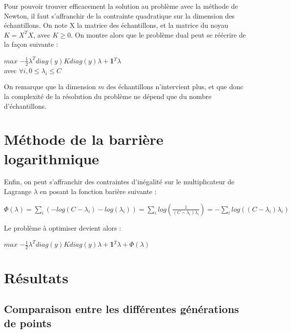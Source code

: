 \documentclass{article}
\begin{document}
Pour pouvoir trouver efficacement la solution au problème avec la méthode de Newton, il faut s'affranchir de la contrainte quadratique sur la dimension des échantillons. On note X la matrice des échantillons, et la matrice du noyau $K = X^TX$, avec $K \geq 0$. On montre alors que le problème dual peut se réécrire de la façon suivante :\\

                 \begin{center}
                 $max$ $-\frac{1}{2}\lambda^Tdiag(y)Kdiag(y)\lambda+$\textbf{1}$^T\lambda$\\
                 avec $\forall i, 0 \leq \lambda_i \leq C$ 
                 \end{center}

On remarque que la dimension $m$ des échantillons n'intervient plus, et que donc la complexité de la résolution du problème ne dépend que du nombre d'échantillons. 

\section{Méthode de la barrière logarithmique}

Enfin, on peut s'affranchir des contraintes d'inégalité sur le multiplicateur de Lagrange $\lambda$ en posant la fonction barière suivante :\\

          \begin{center}
          $\Phi(\lambda) = \sum_i (- log(C - \lambda_i) - log(\lambda_i)) = \sum_i log(\frac{1}{(C - \lambda_i)\lambda_i}) = - \sum_i log((C - \lambda_i)\lambda_i)$ 
          \end{center}

Le problème à optimiser devient alors :\\

          \begin{center}
          $max$ $-\frac{1}{2}\lambda^Tdiag(y)Kdiag(y)\lambda+$\textbf{1}$^T\lambda + \Phi(\lambda)$\\ 
          \end{center}

\section{Résultats}

\subsection{Comparaison entre les différentes générations de points}
\end{document}
